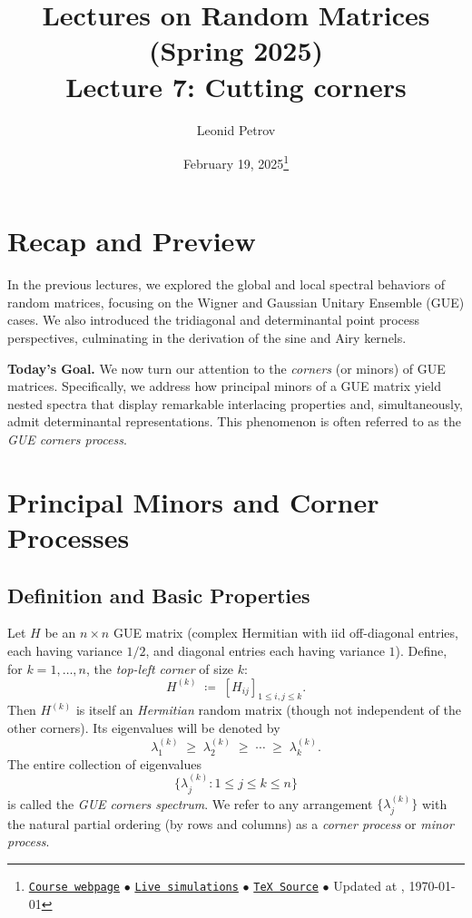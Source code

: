 \documentclass[letterpaper,11pt,oneside,reqno]{article}
\numberwithin{equation}{section}
\theoremstyle{definition}
\begin{document}
\title{Lectures on Random Matrices
(Spring 2025)
\\Lecture 7: Cutting corners}


\date{February 19, 2025\footnote{\href{https://lpetrov.cc/rmt25/}{\texttt{Course webpage}}
$\bullet$ \href{https://lpetrov.cc/simulations/model/random-matrices/}{\texttt{Live simulations}}
$\bullet$ \href{https://lpetrov.cc/rmt25/rmt25-notes/rmt2025-l07.tex}{\texttt{TeX Source}}
$\bullet$
Updated at \currenttime, \today}}



\author{Leonid Petrov}


\maketitle



\tableofcontents

\section{Recap and Preview}

In the previous lectures, we explored the global and local spectral behaviors of random matrices, focusing on the Wigner and Gaussian Unitary Ensemble (GUE) cases. We also introduced the tridiagonal and determinantal point process perspectives, culminating in the derivation of the sine and Airy kernels. 

\medskip

\noindent
\textbf{Today's Goal.} We now turn our attention to the \emph{corners} (or minors) of GUE matrices. Specifically, we address how principal minors of a GUE matrix yield nested spectra that display remarkable interlacing properties and, simultaneously, admit determinantal representations. This phenomenon is often referred to as the \emph{GUE corners process}.

\section{Principal Minors and Corner Processes}

\subsection{Definition and Basic Properties}

Let \(H\) be an \(n\times n\) GUE matrix (complex Hermitian with iid off-diagonal entries, each having variance \(1/2\), and diagonal entries each having variance \(1\)). Define, for \(k=1,\dots,n\), the \emph{top-left corner} of size \(k\):
\[
	H^{(k)} \;\coloneqq\; [H_{ij}]_{1\le i,j\le k}.
\]
Then \(H^{(k)}\) is itself an \emph{Hermitian} random matrix (though not independent of the other corners). Its eigenvalues will be denoted by
\[
	\lambda_1^{(k)} \;\ge\; \lambda_2^{(k)} \;\ge\; \cdots \;\ge\; \lambda_k^{(k)}.
\]
The entire collection of eigenvalues
\[
	\bigl\{\lambda_j^{(k)}: 1 \le j \le k \le n\bigr\}
\]
is called the \emph{GUE corners spectrum}. We refer to any arrangement \(\{\lambda_j^{(k)}\}\) with the natural partial ordering (by rows and columns) as a \emph{corner process} or \emph{minor process}.
\end{document}
